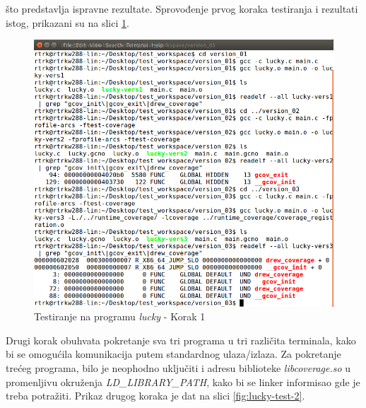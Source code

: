 \documentclass[12pt,oneside]{memoir}
\newcommand{\strano}[1]{\textit{#1}}
\begin{document}
\noindent što predstavlja ispravne rezultate. Sprovođenje prvog koraka testiranja i rezultati istog, prikazani su na slici \ref{fig:lucky-test-1}.

\begin{figure}[!ht]
  \centering
  \includegraphics[width=\textwidth]{img/lucky1-ng.png}
  \caption{Testiranje na programu \strano{lucky} - Korak 1}
  \label{fig:lucky-test-1}
\end{figure}

Drugi korak obuhvata pokretanje sva tri programa u tri različita terminala, kako bi se omogućila komunikacija putem standardnog ulaza/izlaza. Za pokretanje trećeg programa, bilo je neophodno uključiti i adresu biblioteke \strano{libcoverage.so} u promenljivu okruženja \strano{LD\_LIBRARY\_PATH}, kako bi se linker informisao gde je treba potražiti. Prikaz drugog koraka je dat na slici \ref{fig:lucky-test-2}. 
\end{document}
